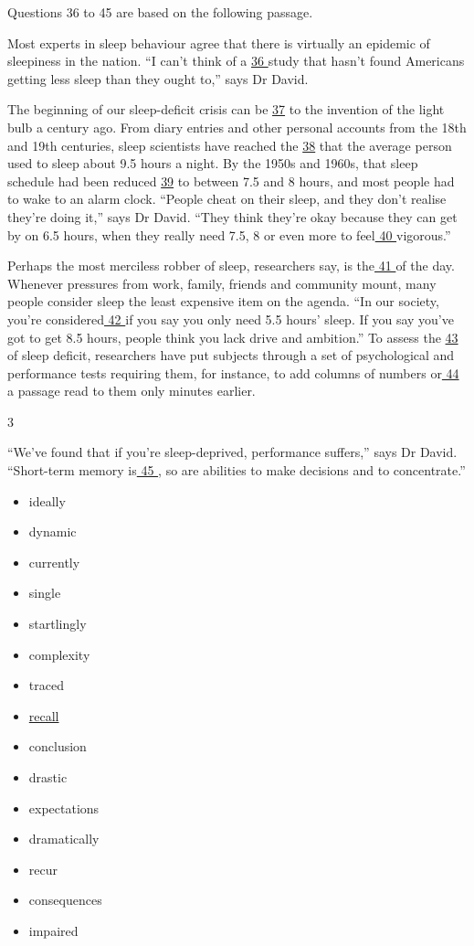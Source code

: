 \documentclass[UTF8,11pt]{ctexart}
\begin{document}
Questions 36 to 45 are based on the following passage.


Most experts in sleep behaviour agree that there is virtually an epidemic of sleepiness in the nation. “I can’t think of a \uline{36 }study that hasn’t found Americans getting less sleep than they ought to,” says Dr David.


The beginning of our sleep-deficit crisis can be \uline{37} to the invention of the light bulb a century ago. From diary entries and other personal accounts from the 18th and 19th centuries, sleep scientists have reached the \uline{38} that the average person used to sleep about 9.5 hours a night. By the 1950s and 1960s, that sleep schedule had been reduced \uline{39} to between 7.5 and 8 hours, and most people had to wake to an alarm clock. “People cheat on their sleep, and they don’t realise they’re doing it,” says Dr David. “They think they’re okay because they can get by on 6.5 hours, when they really need 7.5, 8 or even more to feel\uline{ 40 }vigorous.”


Perhaps the most merciless robber of sleep, researchers say, is the\uline{ 41 }of the day. Whenever pressures from work, family, friends and community mount, many people consider sleep the least expensive item on the agenda. “In our society, you’re considered\uline{ 42 }if you say you only need 5.5 hours’ sleep. If you say you’ve got to get 8.5 hours, people think you lack drive and ambition.” To assess the \uline{43} of sleep deficit, researchers have put subjects through a set of psychological and performance tests requiring them, for instance, to add columns of numbers or\uline{ 44 }a passage read to them only minutes earlier.


3


“We’ve found that if you’re sleep-deprived, performance suffers,” says Dr David. “Short-term memory is\uline{ 45 }, so are abilities to make decisions and to concentrate.”


\begin{itemize}[leftmargin=2em,itemsep=.2em,topsep=.4em]\item[A.] ideally
\item[B.] dynamic
\item[C.] currently
\item[D.] single
\item[E.] startlingly
\item[F.] complexity
\item[G.] traced
\item[H.] \uline{recall}
\item[I.] conclusion
\item[J.] drastic
\item[K.] expectations
\item[L.] dramatically
\item[M.] recur
\item[N.] consequences
\item[O.] impaired
\end{itemize}
\end{document}

